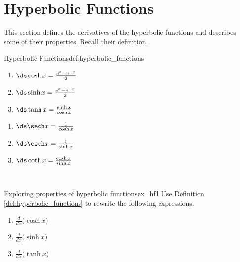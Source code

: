 \section{Hyperbolic Functions}\label{sec:hyperbolic}

This section defines the derivatives of the hyperbolic functions and describes some of their properties. Recall their definition.

\begin{definition}{Hyperbolic Functions}{def:hyperbolic_functions} 
{\noindent%
\begin{minipage}{.5\specialboxlength}
\begin{enumerate}
\item		$\ds \cosh x = \frac{e^x+e^{-x}}2$
\item		$\ds \sinh x = \frac{e^x-e^{-x}}2$
\item		$\ds \tanh x = \frac{\sinh x}{\cosh x}$
\end{enumerate}
\end{minipage}
\begin{minipage}{.5\specialboxlength}
\begin{enumerate}\addtocounter{enumi}{3}
\item		$\ds \sech x = \frac{1}{\cosh x}$
\item		$\ds \csch x = \frac{1}{\sinh x}$
\item		$\ds \coth x = \frac{\cosh x}{\sinh x}$
\end{enumerate}
\end{minipage}
}\\
\end{definition}

\begin{example}{Exploring properties of hyperbolic functions}{ex_hf1}
\noindent Use Definition \ref{def:hyperbolic_functions} to rewrite the following expressions.
\begin{enumerate}
\item		$\frac{d}{dx}\big(\cosh x\big)$
\item		$\frac{d}{dx}\big(\sinh x\big)$
\item		$\frac{d}{dx}\big(\tanh x\big)$
\end{enumerate}
\end{example}

